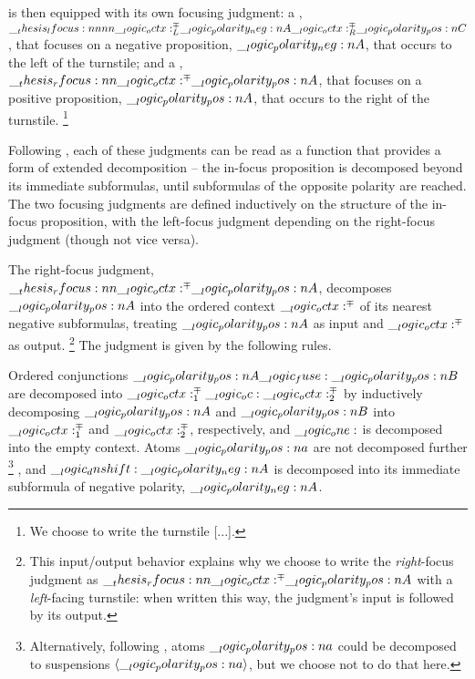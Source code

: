  is then equipped with its own focusing judgment: a , $\__thesis_lfocus:nnnn {\__logic_octx:^{\mp}_L} {\__logic_polarity_neg:n {A}} {\__logic_octx:^{\mp}_R} {\__logic_polarity_pos:n {C}}$, that focuses on a negative proposition, $\__logic_polarity_neg:n {A}$, that occurs to the left of the turnstile; and a , $\__thesis_rfocus:nn {\__logic_octx:^{\mp}} {\__logic_polarity_pos:n {A}}$, that focuses on a positive proposition, $\__logic_polarity_pos:n {A}$, that occurs to the right of the turnstile.%
\footnote{We choose to write the turnstile [...].}

Following \textcite{Zeilberger:??}, each of these judgments can be read as a function that provides a form of extended decomposition -- the in-focus proposition is decomposed beyond its immediate subformulas, until subformulas of the opposite polarity are reached.
% 
The two focusing judgments are defined inductively on the structure of the in-focus proposition, with the left-focus judgment depending on the right-focus judgment (though not vice versa).

The right-focus judgment, $\__thesis_rfocus:nn {\__logic_octx:^{\mp}} {\__logic_polarity_pos:n {A}}$, decomposes $\__logic_polarity_pos:n {A}$ into the ordered context $\__logic_octx:^{\mp}$ of its nearest negative subformulas, treating $\__logic_polarity_pos:n {A}$ as input and $\__logic_octx:^{\mp}$ as output.%
\footnote{This input/output behavior explains why we choose to write the \emph{right}-focus judgment as $\__thesis_rfocus:nn {\__logic_octx:^{\mp}} {\__logic_polarity_pos:n {A}}$ with a \emph{left}-facing turnstile:
  when written this way, the judgment's input is followed by its output.}
The judgment is given by the following rules.
Ordered conjunctions $\__logic_polarity_pos:n {A} \__logic_fuse: \__logic_polarity_pos:n {B}$ are decomposed into $\__logic_octx:^{\mp}_1 \__logic_oc: \__logic_octx:^{\mp}_2$ by inductively decomposing $\__logic_polarity_pos:n {A}$ and $\__logic_polarity_pos:n {B}$ into $\__logic_octx:^{\mp}_1$ and $\__logic_octx:^{\mp}_2$, respectively, and $\__logic_one:$ is decomposed into the empty context.
Atoms $\__logic_polarity_pos:n {a}$ are not decomposed further%
\footnote{Alternatively, following \textcite{Simmons:CMU12}, atoms $\__logic_polarity_pos:n {a}$ could be decomposed to suspensions $\langle\__logic_polarity_pos:n {a}\rangle$, but we choose not to do that here.}%
, and $\__logic_dnshift: \__logic_polarity_neg:n {A}$ is decomposed into its immediate subformula of negative polarity, $\__logic_polarity_neg:n {A}$.

